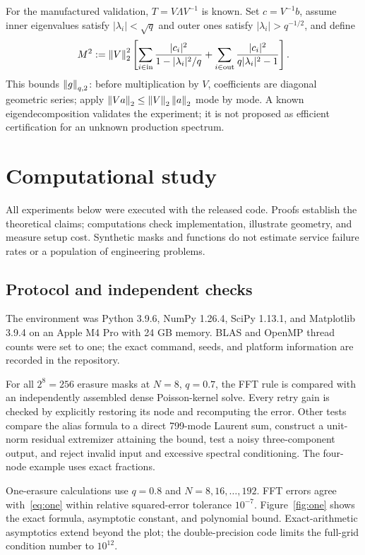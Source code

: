 \documentclass[final,leqno,letterpaper]{etna}
\begin{document}
For the manufactured validation, $T=V\Lambda V^{-1}$ is known. Set $c=V^{-1}b$, assume inner eigenvalues satisfy $|\lambda_i|<\sqrt q$ and outer ones satisfy $|\lambda_i|>q^{-1/2}$, and define
\begin{equation}
M^2:=\left\lVert V\right\rVert_2^2\left[
\sum_{i\in\mathrm{in}}\frac{|c_i|^2}{1-|\lambda_i|^2/q}
+\sum_{i\in\mathrm{out}}\frac{|c_i|^2}{q|\lambda_i|^2-1}\right].
\label{eq:Mmatrix}
\end{equation}
This bounds $\left\lVert g\right\rVert_{q,2}$: before multiplication by $V$, coefficients are diagonal geometric series; apply $\left\lVert Va\right\rVert_2\le\left\lVert V\right\rVert_2\left\lVert a\right\rVert_2$ mode by mode. A known eigendecomposition validates the experiment; it is not proposed as efficient certification for an unknown production spectrum.

\FloatBarrier
\section{Computational study}
All experiments below were executed with the released code. Proofs establish the theoretical claims; computations check implementation, illustrate geometry, and measure setup cost. Synthetic masks and functions do not estimate service failure rates or a population of engineering problems.

\FloatBarrier
\subsection{Protocol and independent checks}
The environment was Python 3.9.6, NumPy 1.26.4, SciPy 1.13.1, and Matplotlib 3.9.4 on an Apple M4 Pro with 24 GB memory. BLAS and OpenMP thread counts were set to one; the exact command, seeds, and platform information are recorded in the repository.

For all $2^8=256$ erasure masks at $N=8$, $q=0.7$, the FFT rule is compared with an independently assembled dense Poisson-kernel solve. Every retry gain is checked by explicitly restoring its node and recomputing the error. Other tests compare the alias formula to a direct 799-mode Laurent sum, construct a unit-norm residual extremizer attaining the bound, test a noisy three-component output, and reject invalid input and excessive spectral conditioning. The four-node example uses exact fractions.

One-erasure calculations use $q=0.8$ and $N=8,16,\ldots,192$. FFT errors agree with~\eqref{eq:one} within relative squared-error tolerance $10^{-7}$. Figure~\ref{fig:one} shows the exact formula, asymptotic constant, and polynomial bound. Exact-arithmetic asymptotics extend beyond the plot; the double-precision code limits the full-grid condition number to $10^{12}$.
\end{document}
